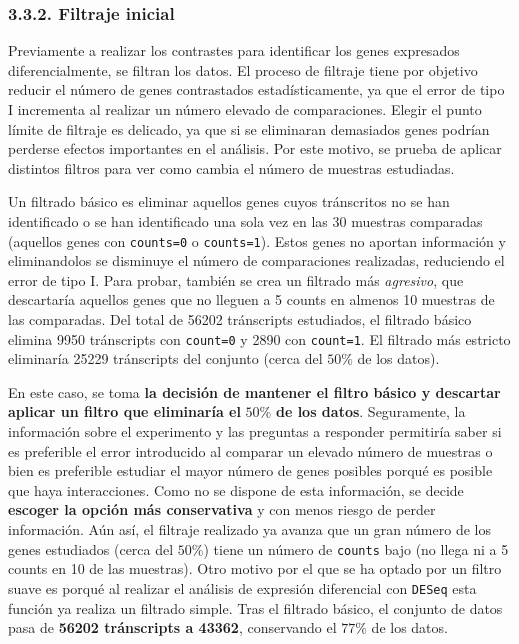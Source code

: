 \documentclass[
]{article}
\begin{document}
\hypertarget{filtraje-inicial}{%
\subsubsection{3.3.2. Filtraje inicial}\label{filtraje-inicial}}

Previamente a realizar los contrastes para identificar los genes
expresados diferencialmente, se filtran los datos. El proceso de
filtraje tiene por objetivo reducir el número de genes contrastados
estadísticamente, ya que el error de tipo I incrementa al realizar un
número elevado de comparaciones. Elegir el punto límite de filtraje es
delicado, ya que si se eliminaran demasiados genes podrían perderse
efectos importantes en el análisis. Por este motivo, se prueba de
aplicar distintos filtros para ver como cambia el número de muestras
estudiadas.

Un filtrado básico es eliminar aquellos genes cuyos tránscritos no se
han identificado o se han identificado una sola vez en las 30 muestras
comparadas (aquellos genes con \texttt{counts=0} o \texttt{counts=1}).
Estos genes no aportan información y eliminandolos se disminuye el
número de comparaciones realizadas, reduciendo el error de tipo I. Para
probar, también se crea un filtrado más \emph{agresivo}, que descartaría
aquellos genes que no lleguen a 5 counts en almenos 10 muestras de las
comparadas. Del total de 56202 tránscripts estudiados, el filtrado
básico elimina 9950 tránscripts con \texttt{count=0} y 2890 con
\texttt{count=1}. El filtrado más estricto eliminaría 25229 tránscripts
del conjunto (cerca del \(50\%\) de los datos).

En este caso, se toma \textbf{la decisión de mantener el filtro básico y
descartar aplicar un filtro que eliminaría el} \(50\%\) \textbf{de los
datos}. Seguramente, la información sobre el experimento y las preguntas
a responder permitiría saber si es preferible el error introducido al
comparar un elevado número de muestras o bien es preferible estudiar el
mayor número de genes posibles porqué es posible que haya interacciones.
Como no se dispone de esta información, se decide \textbf{escoger la
opción más conservativa} y con menos riesgo de perder información. Aún
así, el filtraje realizado ya avanza que un gran número de los genes
estudiados (cerca del \(50\%\)) tiene un número de \texttt{counts} bajo
(no llega ni a 5 counts en 10 de las muestras). Otro motivo por el que
se ha optado por un filtro suave es porqué al realizar el análisis de
expresión diferencial con \texttt{DESeq} esta función ya realiza un
filtrado simple. Tras el filtrado básico, el conjunto de datos pasa de
\textbf{56202 tránscripts a 43362}, conservando el \(77\%\) de los
datos.
\end{document}
